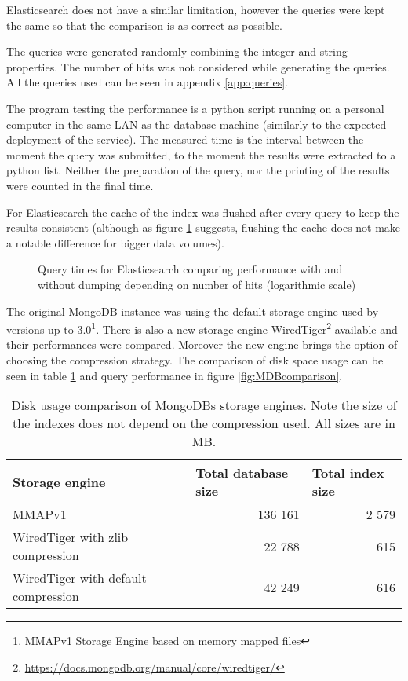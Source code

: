 Elasticsearch does not have a similar limitation, however the queries were kept
the same so that the comparison is as correct as possible.

The queries were generated randomly combining the integer and string properties. The number of hits was not 
considered while generating the queries. All the queries used can be seen in appendix \ref{app:queries}.

The program testing the performance is a python script running on a personal computer in the same LAN as the 
database machine (similarly to the expected deployment of the service). The measured time is the interval between 
the moment the query was submitted, to the moment the results were extracted to a python list. Neither the 
preparation of the query, nor the printing of the results were counted in the final time. 

For Elasticsearch the cache of the index was flushed after every query to keep the results consistent (although as 
figure \ref{fig:EScache} suggests, flushing the cache does not make a notable difference for bigger data volumes). 

\begin{figure}[h]
	\centering
	
	\caption{Query times for Elasticsearch comparing performance with and without dumping depending on number of 
	hits (logarithmic scale)}
	\label{fig:EScache}
\end{figure}
\pagebreak
The original MongoDB instance was using the default storage engine used by versions up to 3.0\footnote{MMAPv1 
Storage Engine based on memory mapped files}. There is also a new storage engine WiredTiger\footnote{
\url{https://docs.mongodb.org/manual/core/wiredtiger/}} available and their performances were compared.
Moreover the new engine brings the option of choosing the compression strategy. The comparison of disk space usage 
can be seen in table \ref{tab:MongoComp} and query performance in figure \ref{fig:MDBcomparison}.

\begin{table}[h]
\centering
\begin{tabular}{|l|r|r|}
\hline
Storage engine                      & \multicolumn{1}{l|}{Total database size} & \multicolumn{1}{l|}{Total index size} \\ \hline
MMAPv1                              & 136 161                                  & 2 579                                 \\ \hline
WiredTiger with zlib compression    & 22 788                                   & 615                                   \\ \hline
WiredTiger with default compression & 42 249                                   & 616                                   \\ \hline
\end{tabular}
\caption{Disk usage comparison of MongoDBs storage engines. Note the size of the indexes does not depend on the
compression used. All sizes are in MB.}
\label{tab:MongoComp}
\end{table}

